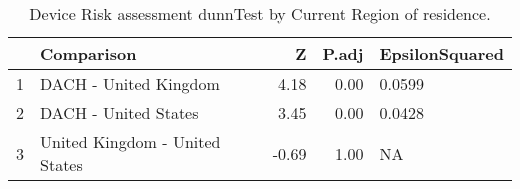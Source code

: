 \begin{table}[ht]
\centering
\begin{tabular}{rlrrl}
  \hline
 & Comparison & Z & P.adj & EpsilonSquared \\ 
  \hline
1 & DACH - United Kingdom & 4.18 & 0.00 & 0.0599 \\ 
  2 & DACH - United States & 3.45 & 0.00 & 0.0428 \\ 
  3 & United Kingdom - United States & -0.69 & 1.00 & NA \\ 
   \hline
\end{tabular}
\caption{Device Risk assessment dunnTest by Current Region of residence.} 
\end{table}
